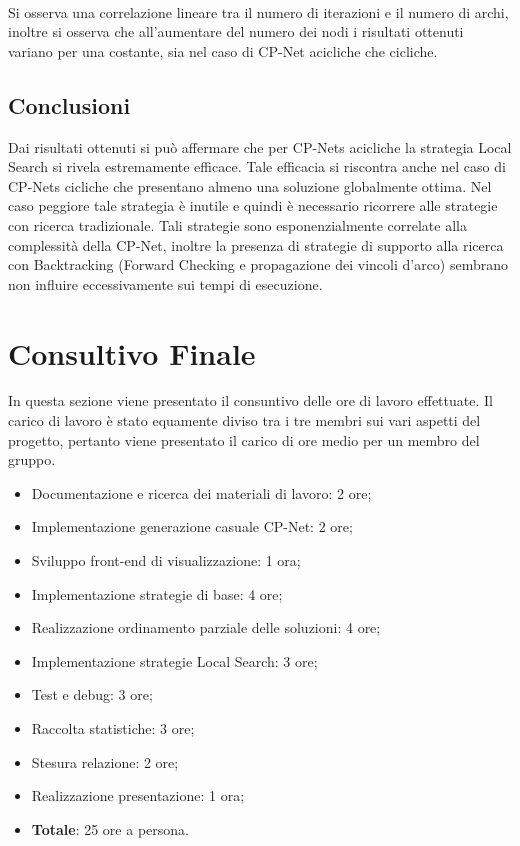 \documentclass[a4paper,titlepage]{article}
\begin{document}
\\Si osserva una correlazione lineare tra il numero di iterazioni e il numero di archi, inoltre si osserva che all'aumentare del numero dei nodi i risultati ottenuti variano per una costante, sia nel caso di CP-Net acicliche che cicliche.
\subsection{Conclusioni}
Dai risultati ottenuti si può affermare che per CP-Nets acicliche la strategia Local Search si rivela estremamente efficace. Tale efficacia si riscontra anche nel caso di CP-Nets cicliche che presentano almeno una soluzione globalmente ottima. Nel caso peggiore tale strategia è inutile e quindi è necessario ricorrere alle strategie con ricerca tradizionale. Tali strategie sono esponenzialmente correlate alla complessità della CP-Net, inoltre la presenza di strategie di supporto alla ricerca con Backtracking (Forward Checking e propagazione dei vincoli d'arco) sembrano non influire eccessivamente sui tempi di esecuzione.
\section{Consultivo Finale}
In questa sezione viene presentato il consuntivo delle ore di lavoro effettuate. Il carico di lavoro è stato equamente diviso tra i tre membri sui vari aspetti del progetto, pertanto viene presentato il carico di ore medio per un membro del gruppo.
\begin{itemize}
\item Documentazione e ricerca dei materiali di lavoro: 2 ore;
\item Implementazione generazione casuale CP-Net: 2 ore;
\item Sviluppo front-end di visualizzazione: 1 ora;
\item Implementazione strategie di base: 4 ore;
\item Realizzazione ordinamento parziale delle soluzioni: 4 ore;
\item Implementazione strategie Local Search: 3 ore;
\item Test e debug: 3 ore;
\item Raccolta statistiche: 3 ore;
\item Stesura relazione: 2 ore;
\item Realizzazione presentazione: 1 ora;
\item \textbf{Totale}: 25 ore a persona.
\end{itemize}
\end{document}
